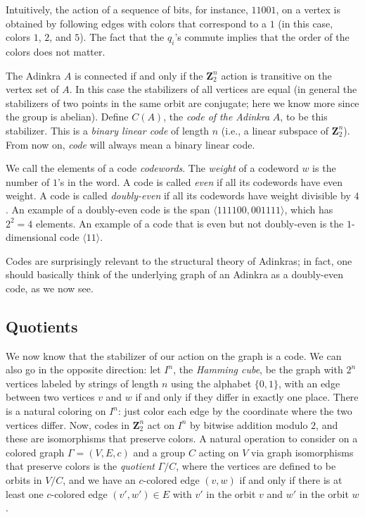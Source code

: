 \documentclass[12pt,twoside,singlespace]{article}
\numberwithin{equation}{section}
\theoremstyle{definition}
\newcommand{\ZZ}{\mathbf{Z}}
\begin{document}
Intuitively, the action of a sequence of bits, for instance, $11001$, on a vertex is obtained by following edges with colors that correspond to a $1$ (in this case, colors $1$, $2$, and $5$).  The fact that the $q_i$'s commute implies that the order of the colors does not matter.

The Adinkra $A$ is connected if and only if the $\ZZ_2^n$ action is transitive on the vertex set of $A$.  In this case the stabilizers of all vertices are equal (in general the stabilizers of two points in the same orbit are conjugate; here we know more since the group is abelian).  Define $C(A)$, the \emph{code of the Adinkra} $A$, to be this stabilizer.  This is a \emph{binary linear code} of length $n$ (i.e., a linear subspace of $\ZZ_2^n$). From now on, \emph{code} will always mean a binary linear code.

We call the elements of a code  \emph{codewords}. The \emph{weight} of a codeword $w$ is the number of $1$'s in the word. A code is called \emph{even} if all its codewords have even weight. A code is called \emph{doubly-even} if all its codewords have weight divisible by $4$. An example of a doubly-even code is the span $\langle 111100, 001111\rangle$, which has $2^2 = 4$ elements. An example of a code that is even but not doubly-even is the $1$-dimensional code $\langle 11 \rangle$.

Codes are surprisingly relevant to the structural theory of Adinkras; in fact, one should basically think of the underlying graph of an Adinkra as a doubly-even code, as we now see.

\subsection{Quotients}
We now know that the stabilizer of our action on the graph is a code. We can also go in the opposite direction: let $I^n$, the \emph{Hamming cube}, be the graph with $2^n$ vertices labeled by strings of length $n$ using the alphabet $\{0, 1\}$, with an edge between two vertices $v$ and $w$ if and only if they differ in exactly one place. There is a natural coloring on $I^n$: just color each edge by the coordinate where the two vertices differ.  Now, codes in $\ZZ_2^n$ act on $I^n$ by bitwise addition modulo $2$, and these are isomorphisms that preserve colors.  A natural operation to consider on a colored graph $\Gamma=(V,E,c)$ and a group $C$ acting on $V$ via graph isomorphisms that preserve colors is the \emph{quotient} $\Gamma/C$, where the vertices are defined to be orbits in $V/C$, and we have an $c$-colored edge $(v,w)$ if and only if there is at least one $c$-colored edge $(v',w') \in E$ with $v'$ in the orbit $v$ and $w'$ in the orbit $w$. 
\end{document}
